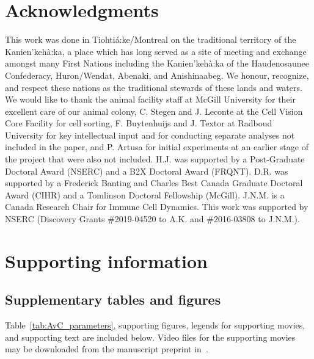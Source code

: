 \section{Acknowledgments}

This work was done in Tiohtiá:ke/Montreal on the traditional territory of the Kanien’kehà:ka, a place which has long served as a site of meeting and exchange amongst many First Nations including the Kanien’kehà:ka of the Haudenosaunee Confederacy, Huron/Wendat, Abenaki, and Anishinaabeg. We honour, recognize, and respect these nations as the traditional stewards of these lands and waters. We would like to thank the animal facility staff at McGill University for their excellent care of our animal colony, C. Stegen and J. Leconte at the Cell Vision Core Facility for cell sorting, F. Buytenhuijs and J. Textor at Radboud University for key intellectual input and for conducting separate analyses not included in the paper, and P. Artusa for initial experiments at an earlier stage of the project that were also not included. H.J. was supported by a Post-Graduate Doctoral Award (NSERC) and a B2X Doctoral Award (FRQNT). D.R. was supported by a Frederick Banting and Charles Best Canada Graduate Doctoral Award (CIHR) and a Tomlinson Doctoral Fellowship (McGill). J.N.M. is a Canada Research Chair for Immune Cell Dynamics. This work was supported by NSERC (Discovery Grants \#2019-04520 to A.K. and \#2016-03808 to J.N.M.).

\newpage
\section{Supporting information}

\renewcommand{\thetable}{S\thechapter.\arabic{table}}
\setcounter{table}{0}

\subsection{Supplementary tables and figures}

Table~\ref{tab:AvC_parameters}, supporting figures, legends for supporting movies, and supporting text are included below. Video files for the supporting movies may be downloaded from the manuscript preprint in~\cite{jamaleddine2022chronic}.

\vspace{0.5in}

